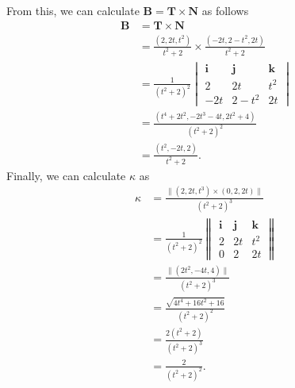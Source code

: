 \documentclass[12 pt, letterpaper]{hmcpset}
\begin{document}
\begin{solution}
\begin{enumerate}
			From this, we can calculate $\mathbf{B} = \mathbf{T} \times \mathbf{N}$ as follows 
			\[
				\begin{split}
					\mathbf{B} & = \mathbf{T} \times \mathbf{N} \\
						   & = \frac{(2, 2t, t^{2})}{t^{2} + 2} \times \frac{(-2t, 2 - t^{2}, 2t)}{t^{2} + 2} \\
						   & = \frac{1}{(t^{2} + 2)^{2}}
						   \begin{vmatrix}
							   \mathbf{i} & \mathbf{j} & \mathbf{k} \\
							   2 & 2t & t^{2} \\
							   -2t & 2 - t^{2} & 2t
						   \end{vmatrix} \\
						   & = \frac{(t^{4} + 2t^{2}, -2t^{3} - 4t, 2t^{2} + 4)}{(t^{2} + 2)^{2}} \\
						   & = \frac{(t^{2}, -2t, 2)}{t^{2} + 2}.
				\end{split}
			\]
			Finally, we can calculate $\kappa$ as
			\[
				\begin{split}
					\kappa & = \frac{\lVert (2, 2t, t^{3}) \times (0, 2, 2t) \rVert}{(t^{2} + 2)^{3}} \\
					       & = \frac{1}{(t^{2} + 2)^{2}}
					       \begin{Vmatrix}
						       \mathbf{i} & \mathbf{j} & \mathbf{k} \\
						       2 & 2t & t^{2} \\
						       0 & 2 & 2t
					       \end{Vmatrix} \\
					       & = \frac{\lVert (2t^{2}, - 4t, 4) \rVert}{(t^{2} + 2)^{3}} \\
					       & = \frac{\sqrt{4t^{4} + 16 t^{2} + 16}}{(t^{2} + 2)^{2}} \\
					       & = \frac{2 (t^{2} + 2)}{(t^{2} + 2)^{3}} \\
					       & = \frac{2}{(t^{2} + 2)^{2}}.
				\end{split}
			\] 


\end{enumerate}
\end{solution}
\end{document}

